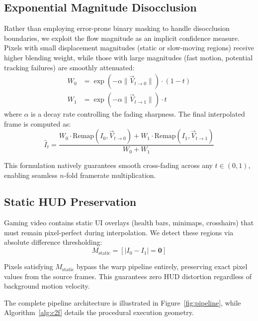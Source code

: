 \documentclass{article}
\begin{document}
\subsection{Exponential Magnitude Disocclusion}

Rather than employing error-prone binary masking to handle disocclusion boundaries, we exploit the flow magnitude as an implicit confidence measure. Pixels with small displacement magnitudes (static or slow-moving regions) receive higher blending weight, while those with large magnitudes (fast motion, potential tracking failures) are smoothly attenuated:
\begin{align}
    W_0 &= \exp\!\left(-\alpha \|\vec{V}_{t \to 0}\|\right) \cdot (1-t) \label{eq:w0} \\
    W_1 &= \exp\!\left(-\alpha \|\vec{V}_{t \to 1}\|\right) \cdot t \label{eq:w1}
\end{align}
where $\alpha$ is a decay rate controlling the fading sharpness. The final interpolated frame is computed as:
\begin{equation}
    \hat{I}_t = \frac{W_0 \cdot \text{Remap}(I_0, \vec{V}_{t \to 0}) + W_1 \cdot \text{Remap}(I_1, \vec{V}_{t \to 1})}{W_0 + W_1}
    \label{eq:blend}
\end{equation}

This formulation natively guarantees smooth cross-fading across any $t \in (0,1)$, enabling seamless $n$-fold framerate multiplication.

\subsection{Static HUD Preservation}

Gaming video contains static UI overlays (health bars, minimaps, crosshairs) that must remain pixel-perfect during interpolation. We detect these regions via absolute difference thresholding:
\begin{equation}
    M_{\text{static}} = \left[\left|I_0 - I_1\right| = \mathbf{0}\right]
    \label{eq:hud}
\end{equation}

Pixels satisfying $M_{\text{static}}$ bypass the warp pipeline entirely, preserving exact pixel values from the source frames. This guarantees zero HUD distortion regardless of background motion velocity.

The complete pipeline architecture is illustrated in Figure~\ref{fig:pipeline}, while Algorithm~\ref{alg:c2f} details the procedural execution geometry.
\end{document}
